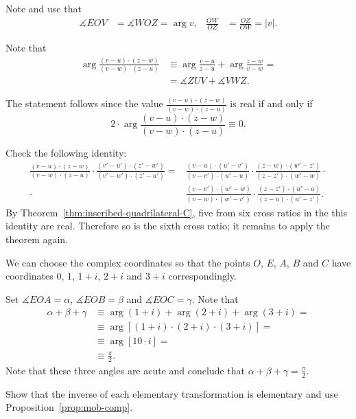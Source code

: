 Note and use that 
\begin{align*}
\measuredangle EOV&=\measuredangle WOZ=\arg v,
&
\frac{OW}{OZ}&=\frac{OZ}{OW}=|v|.
\end{align*}

Note that 
\begin{align*}
\arg\frac{(v-u)\cdot(z-w)}{(v-w)\cdot(z-u)}
&\equiv
\arg\frac{v-u}{z-u}
+
\arg\frac{z-w}{v-w}=
\\
&= \measuredangle ZUV+\measuredangle VWZ.
\end{align*}

The statement follows since the value $\tfrac{(v-u)\cdot(z-w)}{(v-w)\cdot(z-u)}$ is real if and only if 
\[2\cdot\arg\frac{(v-u)\cdot(z-w)}{(v-w)\cdot(z-u)}\equiv0.\]

Check the following identity:
\begin{align*}
\frac{(v-u)\cdot(z-w)}{(v-w)\cdot(z-u)}
\cdot
\frac{(v'-u')\cdot(z'-w')}{(v'-w')\cdot(z'-u')} 
=&
\frac{(v-u)\cdot(u'-v')}{(v-v')\cdot(u'-u)}
\cdot
\frac{(z-w)\cdot(w'-z')}{(z-z')\cdot(w'-w)}
\cdot
\\
\cdot
&
\frac{(v-v')\cdot(w'-w)}{(v-w)\cdot(w'-v')}
\cdot
\frac{(z-z')\cdot(u'-u)}{(z-u)\cdot(u'-z')}.
\end{align*}
By Theorem~\ref{thm:inscribed-quadrilateral-C}, five from six cross ratios in the this identity are real. 
Therefore so is the sixth cross ratio; it remains to apply the theorem again.

We can choose the complex coordinates so that the points $O$, $E$, $A$, $B$ and $C$ have coordinates
$0$, $1$, $1+i$, $2+i$ and $3+i$ correspondingly.

Set $\measuredangle EOA=\alpha$, $\measuredangle EOB=\beta$ and $\measuredangle EOC=\gamma$.
Note that
\begin{align*}
\alpha+\beta+\gamma
&\equiv\arg(1+i)+\arg(2+i)+\arg(3+i)=
\\
&\equiv\arg[(1+i)\cdot(2+i)\cdot(3+i)]=
\\
&\equiv\arg [10\cdot i]=
\\
&\equiv\tfrac\pi2.
\end{align*}
Note that these three angles are acute and conclude that $\alpha+\beta+\gamma=\tfrac\pi2$.

Show that the inverse of each elementary transformation is elementary
and use Proposition~\ref{prop:mob-comp}.

